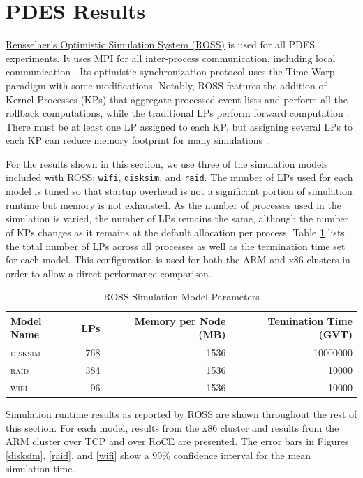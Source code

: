\documentclass[11pt]{book}
\begin{document}
\section{PDES Results}\label{pdes-results}

\href{https://github.com/carothersc/ROSS}{Rensselaer's Optimistic Simulation
  System (ROSS)} is used for all PDES experiments. It uses MPI for all
inter-process communication, including local communication
\cite{carothers-02}. Its optimistic synchronization protocol uses the Time Warp
paradigm with some modifications. Notably, ROSS features the addition of Kernel
Processes (KPs) that aggregate processed event lists and perform all the
rollback computations, while the traditional LPs perform forward computation
\cite{carothers-02}. There must be at least one LP assigned to each KP, but
assigning several LPs to each KP can reduce memory footprint for many
simulations \cite{carothers-02}.

For the results shown in this section, we use three of the simulation models
included with ROSS: \verb;wifi;, \verb;disksim;, and \verb;raid;. The number of
LPs used for each model is tuned so that startup overhead is not a significant
portion of simulation runtime but memory is not exhausted. As the number of
processes used in the simulation is varied, the number of LPs remains the same,
although the number of KPs changes as it remains at the default allocation per
process. Table \ref{lptable} lists the total number of LPs across all
processes as well as the termination time set for each model. This configuration
is used for both the ARM and x86 clusters in order to allow a direct performance
comparison.

\begin{table}
  \caption{ROSS Simulation Model Parameters}
  \label{lptable}
  \centering
  \begin{tabular}[c]{| l | r | r | r |}
    \hline
    Model Name & LPs & Memory per Node (MB) & Temination Time (GVT) \\ \hline
    \textsc{disksim} & 768 & 1536 & 10000000 \\
    \textsc{raid} & 384 & 1536 & 10000 \\
    \textsc{wifi} & 96 & 1536 & 10000 \\
    \hline
  \end{tabular}
\end{table}

Simulation runtime results as reported by ROSS are shown throughout the rest of
this section. For each model, results from the x86 cluster and results from the
ARM cluster over TCP and over RoCE are presented. The error bars in
Figures \ref{disksim}, \ref{raid}, and \ref{wifi} show a 99\%
confidence interval for the mean simulation time.
\end{document}
